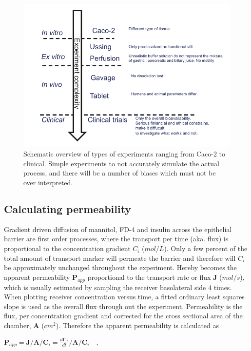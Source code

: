 \begin{figure}[!htpb]

\includegraphics{graphics/typeOfExperiments.pdf}
\caption{Schematic overview of types of experiments ranging from Caco-2 to clinical. Simple experiments to not accurately simulate the actual process, and there will be a number of biases which must not be over interpreted.}
\label{devel_typeOf}
\end{figure}

\subsection{Calculating permeability}
\label{calcPerm}
Gradient driven diffusion of mannitol, FD-4 and insulin across the epithelial barrier are first order processes, where the transport per time (aka. flux) is proportional to the concentration gradient $C_i$ ($mol/L$). Only a few percent of the total amount of transport marker will permeate the barrier and therefore will $C_i$ be approximately unchanged throughout the experiment. Hereby becomes the apparent permeability $\bm{P}_{app}$ proportional to the transport rate or flux $\bm{J}$ ($mol/s$), which is usually estimated by sampling the receiver basolateral side 4 times. When plotting receiver concentration versus time, a fitted ordinary least squares slope is used as the overall flux through out the experiment. Permeability is the flux, per concentration gradient and corrected for the cross sectional area of the chamber, $\bm{A}$ ($cm^2$). Therefore the apparent permeability is calculated as

$\bm{P}_{app} = \bm{J} / \bm{A} / \bm{C}_i = \frac{d\bm{C}_r}{dt} / \bm{A} / \bm{C}_i \quad ,$

